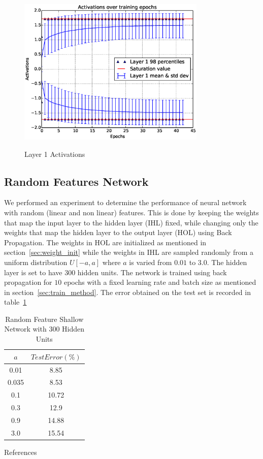\documentclass[Proceedings]{ascelike}
\begin{document}
\begin{figure}[H] \centering \label{fig:actv_dist}
\includegraphics[width=0.8\textwidth, keepaspectratio]{shallownet_actv.eps}
\caption{Layer 1 Activations} \end{figure}


\subsection{Random Features Network} We performed an experiment to determine
the performance of neural network with random (linear and non linear) features.
This is done by keeping the weights that map the input layer to the hidden
layer (IHL) fixed, while changing only the weights that map the hidden layer to
the output layer (HOL) using Back Propagation. The weights in HOL are
initialized as mentioned in section~\ref{sec:weight_init} while the weights in
IHL are sampled randomly from a uniform distribution $U[-a, a]$ where $a$ is
varied from $0.01$ to $3.0$. The hidden layer is set to have $300$ hidden
units. The network is trained using back propagation for $10$ epochs with a
fixed learning rate and batch size as mentioned in
section~\ref{sec:train_method}. The error obtained on the test set is recorded
in table~\ref{tab:terror}

\begin{table}[H] \centering \begin{tabular}{|c||c|} \hline $a$&$Test Error (\%)$\\
\hline \hline 0.01&8.85\\ 0.035&8.53\\ 0.1&10.72\\ 0.3&12.9\\
0.9&14.88\\ 3.0&15.54\\ \hline \end{tabular} \caption{Random Feature Shallow
Network with 300 Hidden Units} \label{tab:terror} \end{table}

{References} 
\end{document}
